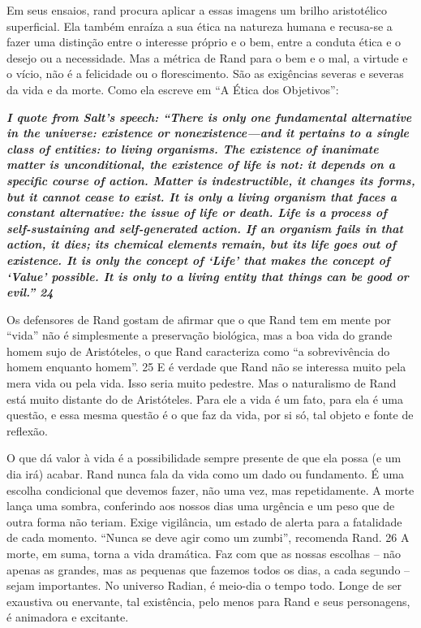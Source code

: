 \par
 
Em seus ensaios, rand procura aplicar a essas imagens um brilho aristotélico superficial. Ela também enraíza a sua ética na natureza humana e recusa-se a fazer uma distinção entre o interesse próprio e o bem, entre a conduta ética e o desejo ou a necessidade. Mas a métrica de Rand para o bem e o mal, a virtude e o vício, não é a felicidade ou o florescimento. São as exigências severas e severas da vida e da morte. Como ela escreve em “A Ética dos Objetivos”:
 
\par
 

 \textbf{\textit{I quote from Salt’s speech: “There is only one fundamental alternative in the universe: existence or nonexistence—and it pertains to a single class of entities: to living organisms. The existence of inanimate matter is unconditional, the existence of life is not: it depends on a specific course of action. Matter is indestructible, it changes its forms, but it cannot cease to exist. It is only a living organism that faces a constant alternative: the issue of life or death. Life is a process of self-sustaining and self-generated action. If an organism fails in that action, it dies; its chemical elements remain, but its life goes out of existence. It is only the concept of ‘Life’ that makes the concept of ‘Value’ possible. It is only to a living entity that things can be good or evil.” {{\color{blue} 24} } } }  
 
 
\par
 
Os defensores de Rand gostam de afirmar que o que Rand tem em mente por “vida” não é simplesmente a preservação biológica, mas a boa vida do grande homem sujo de Aristóteles, o que Rand caracteriza como “a sobrevivência do homem enquanto homem”.
 {\color{blue} 25}  
E é verdade que Rand não se interessa muito pela mera vida ou pela vida. Isso seria muito pedestre. Mas o naturalismo de Rand está muito distante do de Aristóteles. Para ele a vida é um fato, para ela é uma questão, e essa mesma questão é o que faz da vida, por si só, tal objeto e fonte de reflexão.
 
\par
 
O que dá valor à vida é a possibilidade sempre presente de que ela possa (e um dia irá) acabar. Rand nunca fala da vida como um dado ou fundamento. É uma escolha condicional que devemos fazer, não uma vez, mas repetidamente. A morte lança uma sombra, conferindo aos nossos dias uma urgência e um peso que de outra forma não teriam. Exige vigilância, um estado de alerta para a fatalidade de cada momento. “Nunca se deve agir como um zumbi”, recomenda Rand.
 {\color{blue} 26}  
A morte, em suma, torna a vida dramática. Faz com que as nossas escolhas – não apenas as grandes, mas as pequenas que fazemos todos os dias, a cada segundo – sejam importantes. No universo Radian, é meio-dia o tempo todo. Longe de ser exaustiva ou enervante, tal existência, pelo menos para Rand e seus personagens, é animadora e excitante.
 
